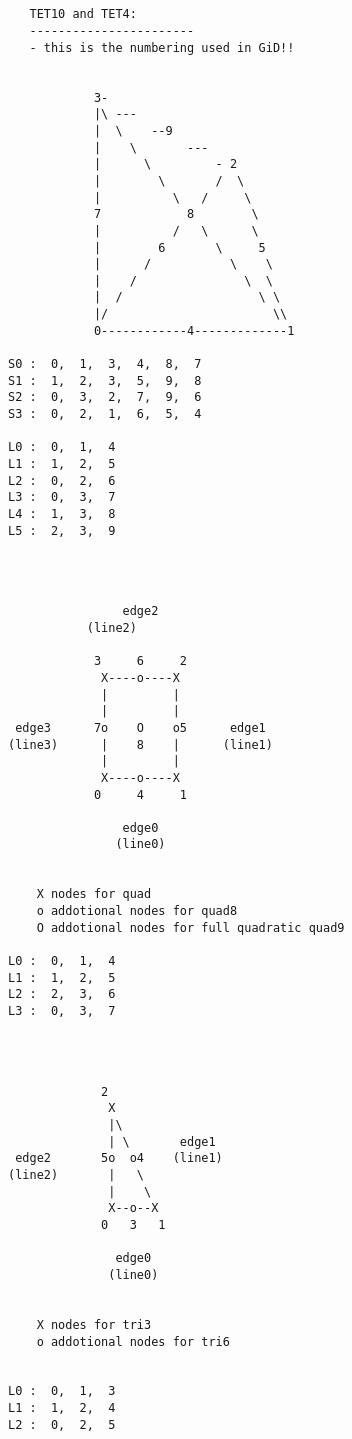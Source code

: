 \begin{verbatim}


   TET10 and TET4:
   -----------------------
   - this is the numbering used in GiD!!


            3-
            |\ ---
            |  \    --9
            |    \       ---
            |      \         - 2
            |        \       /  \
            |          \   /     \
            7            8        \
            |          /   \      \
            |        6       \     5
            |      /           \    \
            |    /               \  \
            |  /                   \ \
            |/                       \\
            0------------4-------------1

S0 :  0,  1,  3,  4,  8,  7
S1 :  1,  2,  3,  5,  9,  8
S2 :  0,  3,  2,  7,  9,  6
S3 :  0,  2,  1,  6,  5,  4

L0 :  0,  1,  4
L1 :  1,  2,  5
L2 :  0,  2,  6
L3 :  0,  3,  7
L4 :  1,  3,  8
L5 :  2,  3,  9

\end{verbatim}

\begin{verbatim}



                edge2
           (line2)

            3     6     2
             X----o----X
             |         |
             |         |   
 edge3      7o    O    o5      edge1      
(line3)      |    8    |      (line1)
             |         |
             X----o----X
            0     4     1

                edge0
               (line0)


    X nodes for quad
    o addotional nodes for quad8
    O addotional nodes for full quadratic quad9

L0 :  0,  1,  4
L1 :  1,  2,  5
L2 :  2,  3,  6
L3 :  0,  3,  7

\end{verbatim}



\begin{verbatim}



             2
              X
              |\
              | \       edge1
 edge2       5o  o4    (line1)
(line2)       |   \
              |    \
              X--o--X
             0   3   1

               edge0
              (line0)


    X nodes for tri3
    o addotional nodes for tri6


L0 :  0,  1,  3
L1 :  1,  2,  4
L2 :  0,  2,  5

\end{verbatim}



